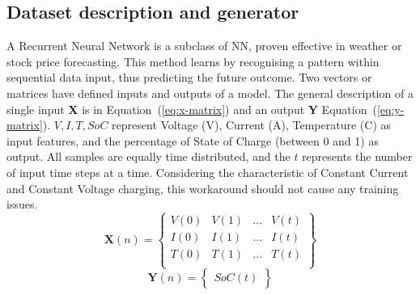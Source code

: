 \subsection{Dataset description and generator} \label{subsec:dataset}
%
A Recurrent Neural Network is a subclass of NN, proven effective in weather or stock price forecasting. %
This method learns by recognising a pattern within sequential data input, thus predicting the future outcome.
Two vectors or matrices have defined inputs and outputs of a model.
The general description of a single input \textbf{X} is in \mbox{Equation~(\ref{eq:x-matrix})} and an output \textbf{Y} \mbox{Equation~(\ref{eq:y-matrix})}.
$V, I, T, SoC$ represent Voltage (V), Current (A), Temperature (\textdegree{}C) as input features, and the percentage of State of Charge (between 0 and 1) as output.
All samples are equally time distributed, and the $t$ represents the number of input time steps at a time.
Considering the characteristic of Constant Current and Constant Voltage charging, this workaround should not cause any training issues.
\begin{equation}
    \textbf{X} \left (n  \right ) =
    \begin{Bmatrix}
        V \left (0  \right ) & V \left (1  \right ) & ... & V \left (t  \right )\\ 
        I \left (0  \right ) & I \left (1  \right ) & ... & I \left (t  \right )\\ 
        T \left (0  \right ) & T \left (1  \right ) & ... & T \left (t  \right )\\
    \end{Bmatrix}
    \label{eq:x-matrix}
\end{equation}
\begin{equation}
    \textbf{Y} \left (n  \right ) =
    \begin{Bmatrix}
        SoC \left (t  \right ) 
    \end{Bmatrix}
    \label{eq:y-matrix}
\end{equation}

